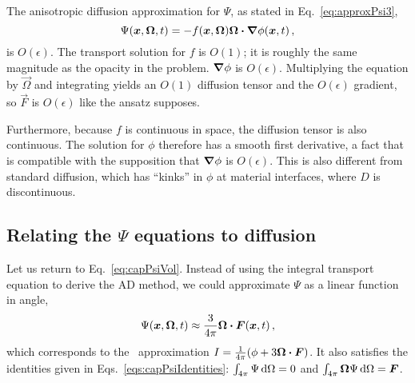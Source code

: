 The anisotropic diffusion approximation for $\Psi$, as stated in
Eq.~\eqref{eq:approxPsi3},
\begin{equation*}
\Psi(\bm{x}, \bm{\Omega}, t) = - f(\bm{x}, \bm{\Omega})
\bm{\Omega}\bm{\cdot} \bm{\nabla} \phi(\bm{x}, t)\,,
\end{equation*}
is $O(\epsilon)$. The transport solution for $f$ is $O(1)$; it is roughly the
same magnitude as the opacity in the problem. $\bm{\nabla} \phi$ is $O(\epsilon)$.
Multiplying the equation by $\vec{\Omega}$ and integrating yields an $O(1)$
diffusion tensor and the $O(\epsilon)$ gradient, so $\vec{F}$ is $O(\epsilon)$
like the ansatz supposes.

Furthermore, because $f$ is continuous in space, the diffusion tensor is also
continuous. The solution for $\phi$ therefore has a smooth first
derivative, a fact that is compatible with the supposition that $\bm{\nabla} \phi$
is $O(\epsilon)$. This is also different from standard diffusion, which has
``kinks'' in $\phi$ at material interfaces, where $D$ is discontinuous.

\subsection{Relating the \texorpdfstring{$\Psi$}{Psi} equations to
diffusion}\label{sec:adDiscDiff}
Let us return to Eq.~\eqref{eq:capPsiVol}. Instead of using the integral
transport equation to derive the AD method, we could approximate $\Psi$
as a linear function in angle,
\begin{equation*}
  \Psi(\bm{x}, \bm{\Omega}, t) \approx \frac{3}{4\pi} \bm{\Omega} \bm{\cdot}
  \bm{F}(\bm{x}, t)\,,
\end{equation*}
which corresponds to the \Pone\ approximation $I= \frac{1}{4\pi} (\phi +
3\bm{\Omega} \bm{\cdot} \bm{F})$. It also satisfies the identities given in
Eqs.~\eqref{eqs:capPsiIdentities}: $\int_{4\pi} \Psi \mathop{}\!\mathrm{d}\Omega = 0$ and
$\int_{4\pi} \bm{\Omega} \Psi \mathop{}\!\mathrm{d}\Omega = \bm{F}$.

